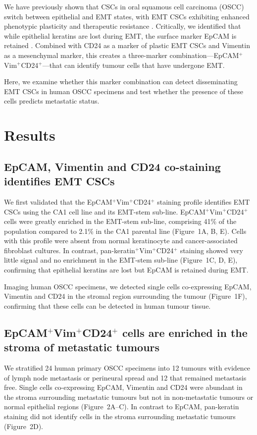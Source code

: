 \documentclass[11pt]{article}
\begin{document}
We have previously shown that CSCs in oral squamous cell carcinoma (OSCC) switch between epithelial and EMT states, with EMT CSCs exhibiting enhanced phenotypic plasticity and therapeutic resistance \citep{biddle2011,biddle2016}. Critically, we identified that while epithelial keratins are lost during EMT, the surface marker EpCAM is retained \citep{biddle2016}. Combined with CD24 as a marker of plastic EMT CSCs and Vimentin as a mesenchymal marker, this creates a three-marker combination---EpCAM$^+$Vim$^+$CD24$^+$---that can identify tumour cells that have undergone EMT.

Here, we examine whether this marker combination can detect disseminating EMT CSCs in human OSCC specimens and test whether the presence of these cells predicts metastatic status.

\section{Results}

\subsection{EpCAM, Vimentin and CD24 co-staining identifies EMT CSCs}

We first validated that the EpCAM$^+$Vim$^+$CD24$^+$ staining profile identifies EMT CSCs using the CA1 cell line and its EMT-stem sub-line. EpCAM$^+$Vim$^+$CD24$^+$ cells were greatly enriched in the EMT-stem sub-line, comprising 41\% of the population compared to 2.1\% in the CA1 parental line (Figure~1A, B, E). Cells with this profile were absent from normal keratinocyte and cancer-associated fibroblast cultures. In contrast, pan-keratin$^+$Vim$^+$CD24$^+$ staining showed very little signal and no enrichment in the EMT-stem sub-line (Figure~1C, D, E), confirming that epithelial keratins are lost but EpCAM is retained during EMT.

Imaging human OSCC specimens, we detected single cells co-expressing EpCAM, Vimentin and CD24 in the stromal region surrounding the tumour (Figure~1F), confirming that these cells can be detected in human tumour tissue.

\subsection{EpCAM$^+$Vim$^+$CD24$^+$ cells are enriched in the stroma of metastatic tumours}

We stratified 24 human primary OSCC specimens into 12 tumours with evidence of lymph node metastasis or perineural spread and 12 that remained metastasis free. Single cells co-expressing EpCAM, Vimentin and CD24 were abundant in the stroma surrounding metastatic tumours but not in non-metastatic tumours or normal epithelial regions (Figure~2A--C). In contrast to EpCAM, pan-keratin staining did not identify cells in the stroma surrounding metastatic tumours (Figure~2D).
\end{document}
